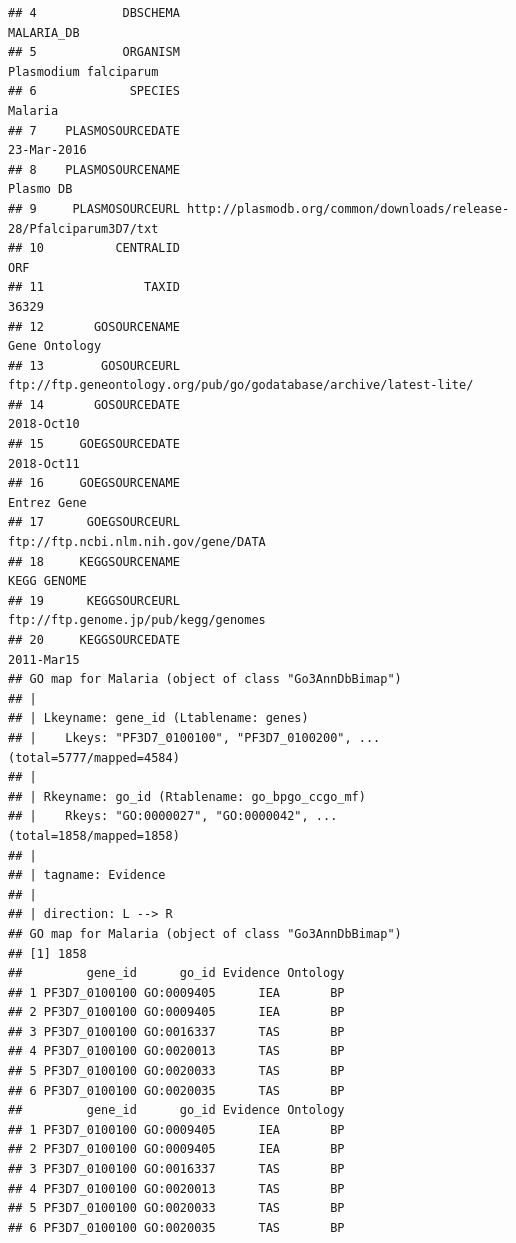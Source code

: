\documentclass{article}\usepackage[]{graphicx}\usepackage[]{color}
\makeatletter
\newenvironment{kframe}{%
 \def\at@end@of@kframe{}%
 \ifinner\ifhmode%
  \def\at@end@of@kframe{\end{minipage}}%
  \begin{minipage}{\columnwidth}%
 \fi\fi%
 \def\FrameCommand##1{\hskip\@totalleftmargin \hskip-\fboxsep
 \colorbox{shadecolor}{##1}\hskip-\fboxsep
     \hskip-\linewidth \hskip-\@totalleftmargin \hskip\columnwidth}%
 \MakeFramed {\advance\hsize-\width
   \@totalleftmargin\z@ \linewidth\hsize
   \@setminipage}}%
 {\par\unskip\endMakeFramed%
 \at@end@of@kframe}
\newenvironment{knitrout}{}{} %
\makeatother
\begin{document}
\begin{knitrout}
\begin{kframe}
\begin{verbatim}
## 4            DBSCHEMA                                                         MALARIA_DB
## 5            ORGANISM                                              Plasmodium falciparum
## 6             SPECIES                                                            Malaria
## 7    PLASMOSOURCEDATE                                                        23-Mar-2016
## 8    PLASMOSOURCENAME                                                          Plasmo DB
## 9     PLASMOSOURCEURL http://plasmodb.org/common/downloads/release-28/Pfalciparum3D7/txt
## 10          CENTRALID                                                                ORF
## 11              TAXID                                                              36329
## 12       GOSOURCENAME                                                      Gene Ontology
## 13        GOSOURCEURL  ftp://ftp.geneontology.org/pub/go/godatabase/archive/latest-lite/
## 14       GOSOURCEDATE                                                         2018-Oct10
## 15     GOEGSOURCEDATE                                                         2018-Oct11
## 16     GOEGSOURCENAME                                                        Entrez Gene
## 17      GOEGSOURCEURL                               ftp://ftp.ncbi.nlm.nih.gov/gene/DATA
## 18     KEGGSOURCENAME                                                        KEGG GENOME
## 19      KEGGSOURCEURL                               ftp://ftp.genome.jp/pub/kegg/genomes
## 20     KEGGSOURCEDATE                                                         2011-Mar15
## GO map for Malaria (object of class "Go3AnnDbBimap")
## |
## | Lkeyname: gene_id (Ltablename: genes)
## |    Lkeys: "PF3D7_0100100", "PF3D7_0100200", ... (total=5777/mapped=4584)
## |
## | Rkeyname: go_id (Rtablename: go_bpgo_ccgo_mf)
## |    Rkeys: "GO:0000027", "GO:0000042", ... (total=1858/mapped=1858)
## |
## | tagname: Evidence
## |
## | direction: L --> R
## GO map for Malaria (object of class "Go3AnnDbBimap")
## [1] 1858
##         gene_id      go_id Evidence Ontology
## 1 PF3D7_0100100 GO:0009405      IEA       BP
## 2 PF3D7_0100100 GO:0009405      IEA       BP
## 3 PF3D7_0100100 GO:0016337      TAS       BP
## 4 PF3D7_0100100 GO:0020013      TAS       BP
## 5 PF3D7_0100100 GO:0020033      TAS       BP
## 6 PF3D7_0100100 GO:0020035      TAS       BP
##         gene_id      go_id Evidence Ontology
## 1 PF3D7_0100100 GO:0009405      IEA       BP
## 2 PF3D7_0100100 GO:0009405      IEA       BP
## 3 PF3D7_0100100 GO:0016337      TAS       BP
## 4 PF3D7_0100100 GO:0020013      TAS       BP
## 5 PF3D7_0100100 GO:0020033      TAS       BP
## 6 PF3D7_0100100 GO:0020035      TAS       BP
\end{verbatim}



\end{kframe}
\end{knitrout}
\end{document}
